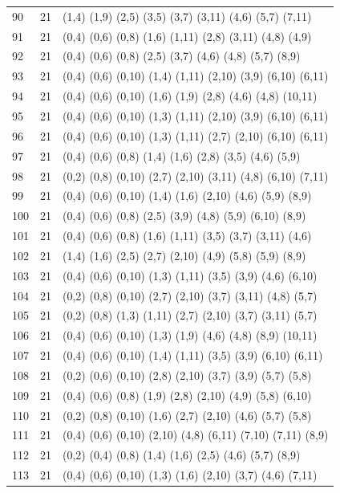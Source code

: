 {\begin{longtable}{lll}
90  & 21 & (1,4) (1,9) (2,5) (3,5) (3,7) (3,11) (4,6) (5,7) (7,11) \\
91  & 21 & (0,4) (0,6) (0,8) (1,6) (1,11) (2,8) (3,11) (4,8) (4,9) \\
92  & 21 & (0,4) (0,6) (0,8) (2,5) (3,7) (4,6) (4,8) (5,7) (8,9) \\
93  & 21 & (0,4) (0,6) (0,10) (1,4) (1,11) (2,10) (3,9) (6,10) (6,11) \\
94  & 21 & (0,4) (0,6) (0,10) (1,6) (1,9) (2,8) (4,6) (4,8) (10,11) \\
95  & 21 & (0,4) (0,6) (0,10) (1,3) (1,11) (2,10) (3,9) (6,10) (6,11) \\
96  & 21 & (0,4) (0,6) (0,10) (1,3) (1,11) (2,7) (2,10) (6,10) (6,11) \\
97  & 21 & (0,4) (0,6) (0,8) (1,4) (1,6) (2,8) (3,5) (4,6) (5,9) \\
98  & 21 & (0,2) (0,8) (0,10) (2,7) (2,10) (3,11) (4,8) (6,10) (7,11) \\
99  & 21 & (0,4) (0,6) (0,10) (1,4) (1,6) (2,10) (4,6) (5,9) (8,9) \\
100 & 21 & (0,4) (0,6) (0,8) (2,5) (3,9) (4,8) (5,9) (6,10) (8,9) \\
101 & 21 & (0,4) (0,6) (0,8) (1,6) (1,11) (3,5) (3,7) (3,11) (4,6) \\
102 & 21 & (1,4) (1,6) (2,5) (2,7) (2,10) (4,9) (5,8) (5,9) (8,9) \\
103 & 21 & (0,4) (0,6) (0,10) (1,3) (1,11) (3,5) (3,9) (4,6) (6,10) \\
104 & 21 & (0,2) (0,8) (0,10) (2,7) (2,10) (3,7) (3,11) (4,8) (5,7) \\
105 & 21 & (0,2) (0,8) (1,3) (1,11) (2,7) (2,10) (3,7) (3,11) (5,7) \\
106 & 21 & (0,4) (0,6) (0,10) (1,3) (1,9) (4,6) (4,8) (8,9) (10,11) \\
107 & 21 & (0,4) (0,6) (0,10) (1,4) (1,11) (3,5) (3,9) (6,10) (6,11) \\
108 & 21 & (0,2) (0,6) (0,10) (2,8) (2,10) (3,7) (3,9) (5,7) (5,8) \\
109 & 21 & (0,4) (0,6) (0,8) (1,9) (2,8) (2,10) (4,9) (5,8) (6,10) \\
110 & 21 & (0,2) (0,8) (0,10) (1,6) (2,7) (2,10) (4,6) (5,7) (5,8) \\
111 & 21 & (0,4) (0,6) (0,10) (2,10) (4,8) (6,11) (7,10) (7,11) (8,9) \\
112 & 21 & (0,2) (0,4) (0,8) (1,4) (1,6) (2,5) (4,6) (5,7) (8,9) \\
113 & 21 & (0,4) (0,6) (0,10) (1,3) (1,6) (2,10) (3,7) (4,6) (7,11) \\

\end{longtable}}
